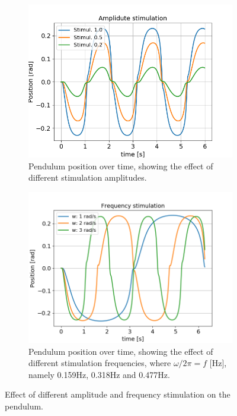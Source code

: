 \documentclass{cmc}
\begin{document}
\begin{figure}[H]
    \centering
    \begin{subfigure}[t]{0.49\textwidth}
        \centering
        \includegraphics[width=\textwidth]{2c/2c_AmplitudeStimulation.png}
        \caption{Pendulum position over time, showing the effect of different stimulation amplitudes.}
    \end{subfigure}
    \hfill
    \begin{subfigure}[t]{0.49\textwidth}
        \centering
        \includegraphics[width=\textwidth]{2c/2c_FrequencyStimulation.png}
        \caption{Pendulum position over time, showing the effect of different stimulation frequencies, where $\omega/ 2\pi = f$ [Hz], namely 0.159Hz, 0.318Hz and 0.477Hz.}
    \end{subfigure}
    \caption{Effect of different amplitude and frequency stimulation on the pendulum.}
    \label{fig:2c_Stimulation}
\end{figure}
\end{document}
